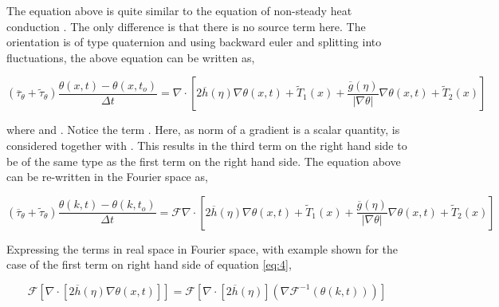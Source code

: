 \documentclass[a4paper,11pt,dvipsnames]{article}
\begin{document}
The equation above is quite similar to the equation of non-steady heat conduction \cite{Shanthraj2019}. 
The only difference is that there is no source term here. 
The orientation \mathsym{\theta} is of type quaternion and 
using backward euler and splitting into fluctuations, the above equation can be written as, 

\begin{equation}
\left ( \overline{\tau}_\theta + \tilde{\tau}_\theta \right ) \frac{\theta (x,t) - \theta (x,t_o)}{\Delta t} = 
\nabla \cdot \left [ 2 \overline{h}(\eta) \nabla \theta (x,t) + \tilde{T}_1 (x) + 
\frac{\overline{g}(\eta)}{\left | \nabla \theta \right |} \nabla \theta (x,t) + \tilde{T}_2 (x)\right ] \label{eq:3}
\end{equation}

where  and 
. 
Notice the term . 
Here, as norm of a gradient is a scalar quantity, \mathsym{\left | \nabla \theta \right |} is 
considered together with . 
This results in the third term on the right hand side to be of the same type as the first term on the right hand side. 
The equation above can be re-written in the Fourier space as,

\begin{equation}
\left ( \overline{\tau}_\theta + \tilde{\tau}_\theta \right ) \frac{\theta (k,t) - \theta (k,t_o)}{\Delta t} = 
\mathcal{F} \nabla \cdot \left [ 2 \overline{h}(\eta) \nabla \theta (x,t) + \tilde{T}_1 (x) + 
\frac{\overline{g}(\eta)}{\left | \nabla \theta \right |} \nabla \theta (x,t) + \tilde{T}_2 (x)\right ] \label{eq:4}
\end{equation}

Expressing the terms in real space in Fourier space, with example shown for the case of the first term on right hand side of 
equation \ref{eq:4}, 

\begin{equation}
\mathcal{F} \left [ \nabla \cdot \left [ 2 \overline{h}(\eta) \nabla \theta (x,t) \right ] \right ] = 
\mathcal{F} \left [ \nabla \cdot \left [ 2 \overline{h}(\eta) \right ] \left ( \nabla \mathcal{F}^{-1} \left (\theta (k,t) \right ) \right ) \right ] \label{eq:5}
\end{equation}
\end{document}
